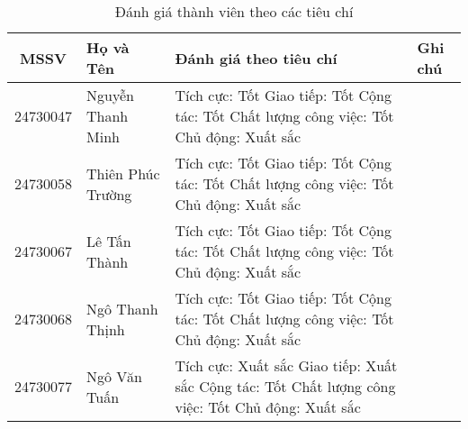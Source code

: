 \documentclass[12pt]{report}
\begin{document}
\begin{table}[h!]
    \centering
    \begin{tabular}{|c|p{120pt}|p{160pt}|p{80pt}|}
        \hline
        \textbf{MSSV}      & \textbf{Họ và Tên} & \textbf{Đánh giá theo tiêu chí} & \textbf{Ghi chú} \\
        \hline
        24730047           & Nguyễn Thanh Minh  &
        Tích cực: Tốt \newline
        Giao tiếp: Tốt \newline
        Cộng tác: Tốt \newline
        Chất lượng công việc: Tốt \newline
        Chủ động: Xuất sắc &                                                                         \\
        \hline
        24730058           & Thiên Phúc Trường  &
        Tích cực: Tốt \newline
        Giao tiếp: Tốt \newline
        Cộng tác: Tốt \newline
        Chất lượng công việc: Tốt \newline
        Chủ động: Xuất sắc &                                                                         \\
        \hline
        24730067           & Lê Tấn Thành       &
        Tích cực: Tốt \newline
        Giao tiếp: Tốt \newline
        Cộng tác: Tốt \newline
        Chất lượng công việc: Tốt \newline
        Chủ động: Xuất sắc &                                                                         \\
        \hline
        24730068           & Ngô Thanh Thịnh    &
        Tích cực: Tốt \newline
        Giao tiếp: Tốt \newline
        Cộng tác: Tốt \newline
        Chất lượng công việc: Tốt \newline
        Chủ động: Xuất sắc &                                                                         \\
        \hline
        24730077           & Ngô Văn Tuấn       &
        Tích cực: Xuất sắc \newline
        Giao tiếp: Xuất sắc \newline
        Cộng tác: Tốt \newline
        Chất lượng công việc: Tốt \newline
        Chủ động: Xuất sắc &                                                                         \\
        \hline
    \end{tabular}
    \caption{Đánh giá thành viên theo các tiêu chí}
    \label{tab:member_ratings}
\end{table}
\end{document}
